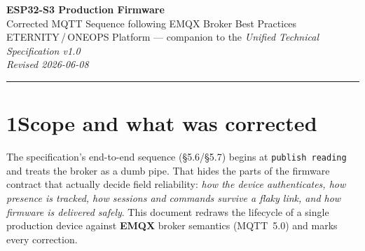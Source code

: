\documentclass[11pt,a4paper]{article}
\begin{document}
\begin{center}
  {\LARGE\bfseries ESP32-S3 Production Firmware}\\[2pt]
  {\large Corrected MQTT Sequence following EMQX Broker Best Practices}\\[6pt]
  {\small ETERNITY\,/\,ONEOPS Platform — companion to the \emph{Unified Technical Specification v1.0}}\\[2pt]
  {\small\itshape Revised 2026-06-08}
\end{center}

\vspace{4pt}
\hrule
\vspace{8pt}

\section*{1\quad Scope and what was corrected}
The specification's end-to-end sequence (\S5.6/\S5.7) begins at \texttt{publish reading}
and treats the broker as a dumb pipe. That hides the parts of the firmware contract that
actually decide field reliability: \emph{how the device authenticates, how presence is
tracked, how sessions and commands survive a flaky link, and how firmware is delivered
safely}. This document redraws the lifecycle of a single production device against
\textbf{EMQX} broker semantics (MQTT~5.0) and marks every correction.
\end{document}
